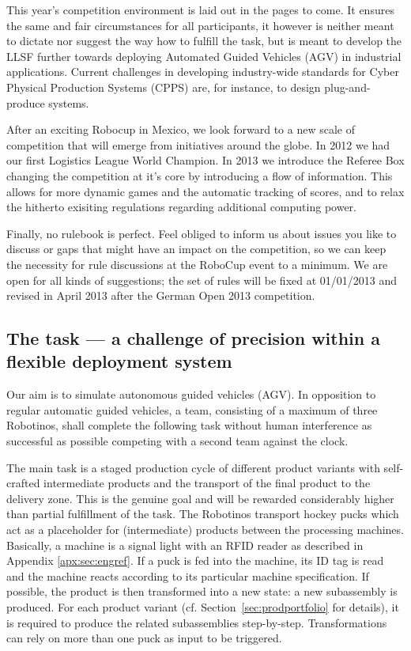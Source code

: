 \documentclass[12pt,twoside]{article}
\newcommand{\refsec}[1]{Section~\ref{#1}}
\begin{document}
This year’s competition environment is laid out in the pages to come.
It ensures the same and fair circumstances for all participants, it
however is neither meant to dictate nor suggest the way how to fulfill
the task, but is meant to develop the LLSF further towards deploying
Automated Guided Vehicles (AGV) in industrial applications. Current
challenges in developing industry-wide standards for Cyber Physical
Production Systems (CPPS) are, for instance, to design
plug-and-produce systems.

After an exciting Robocup in Mexico, we look forward to a new scale of
competition that will emerge from initiatives around the globe. In
2012 we had our first Logistics League World Champion.  In 2013 we
introduce the Referee Box changing the competition at it's core by
introducing a flow of information.  This allows for more dynamic games
and the automatic tracking of scores, and to relax the hitherto
exisiting regulations regarding additional computing power.

Finally, no rulebook is perfect. Feel obliged to inform us about
issues you like to discuss or gaps that might have an impact on the
competition, so we can keep the necessity for rule discussions at the
RoboCup event to a minimum. We are open for all kinds of suggestions;
the set of rules will be fixed at 01/01/2013 and revised in April 2013
after the German Open 2013 competition.

\subsection{The task --- a challenge of precision within a flexible
  deployment system} \label{sec:task}

Our aim is to simulate autonomous guided vehicles (AGV). In opposition
to regular automatic guided vehicles, a team, consisting of a maximum
of three Robotinos, shall complete the following task without human
interference as successful as possible competing with a second team
against the clock.

The main task is a staged production cycle of different product
variants with self-crafted intermediate products and the transport of
the final product to the delivery zone. This is the genuine goal and
will be rewarded considerably higher than partial fulfillment of the
task. The Robotinos transport hockey pucks which act as a placeholder
for (intermediate) products between the processing
machines. Basically, a machine is a signal light with an RFID reader
as described in Appendix \ref{apx:sec:engref}. If a puck is fed into
the machine, its ID tag is read and the machine reacts according to
its particular machine specification. If possible, the product is then
transformed into a new state: a new subassembly is produced. For each
product variant (cf. \refsec{sec:prodportfolio} for details), it is
required to produce the related subassemblies
step-by-step. Transformations can rely on more than one puck as input
to be triggered.
\end{document}
